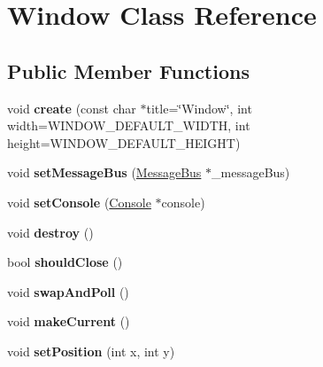 \hypertarget{class_window}{}\section{Window Class Reference}
\label{class_window}
\subsection*{Public Member Functions}
\begin{DoxyCompactItemize}
\item 
\mbox{\label{class_window_afbd9da61dc1a1ed2655757d6ebf30e06}} 
void {\bfseries create} (const char $\ast$title=\char`\"{}Window\char`\"{}, int width=W\+I\+N\+D\+O\+W\+\_\+\+D\+E\+F\+A\+U\+L\+T\+\_\+\+W\+I\+D\+TH, int height=W\+I\+N\+D\+O\+W\+\_\+\+D\+E\+F\+A\+U\+L\+T\+\_\+\+H\+E\+I\+G\+HT)
\item 
\mbox{\label{class_window_a98299cc31328052741e2f73d8c0a6eb5}} 
void {\bfseries set\+Message\+Bus} (\mbox{\hyperlink{class_message_bus}{Message\+Bus}} $\ast$\+\_\+message\+Bus)
\item 
\mbox{\label{class_window_a3b80ba02292bcf8854276094317aa73e}} 
void {\bfseries set\+Console} (\mbox{\hyperlink{class_console}{Console}} $\ast$console)
\item 
\mbox{\label{class_window_aa89262ad2538473c8d7e4d8dd641849d}} 
void {\bfseries destroy} ()
\item 
\mbox{\label{class_window_ae779be3a5327f62c5e86a3e3d8a37289}} 
bool {\bfseries should\+Close} ()
\item 
\mbox{\label{class_window_a9a26761fd7a9653de4847bc309763863}} 
void {\bfseries swap\+And\+Poll} ()
\item 
\mbox{\label{class_window_a1ebbfc7cd6e34ca3d70257305a97b525}} 
void {\bfseries make\+Current} ()
\item 
\mbox{\label{class_window_a397289ae6968f13beec07f071560a4e7}} 
void {\bfseries set\+Position} (int x, int y)
\item 
\mbox{\label{class_window_ae20b120985c60737d6bc12a09b60c2d6}} 

\end{DoxyCompactItemize}
